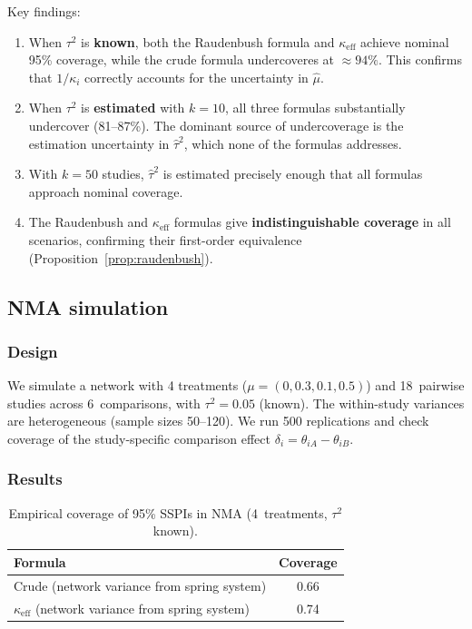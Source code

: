 \documentclass[12pt]{article}
\begin{document}
Key findings:
\begin{enumerate}
  \item When $\tau^2$ is \textbf{known}, both the Raudenbush formula and
    $\kappa_{\mathrm{eff}}$ achieve nominal 95\% coverage, while the
    crude formula undercoveres at $\approx 94\%$.  This confirms that
    $1/\kappa_i$ correctly accounts for the uncertainty in $\hat\mu$.

  \item When $\tau^2$ is \textbf{estimated} with $k=10$, all three
    formulas substantially undercover (81--87\%).  The dominant source of
    undercoverage is the estimation uncertainty in $\hat\tau^2$, which
    none of the formulas addresses.

  \item With $k=50$ studies, $\hat\tau^2$ is estimated precisely enough
    that all formulas approach nominal coverage.

  \item The Raudenbush and $\kappa_{\mathrm{eff}}$ formulas give
    \textbf{indistinguishable coverage} in all scenarios, confirming
    their first-order equivalence (Proposition~\ref{prop:raudenbush}).
\end{enumerate}

\subsection{NMA simulation}

\subsubsection{Design}

We simulate a network with 4 treatments ($\mu = (0, 0.3, 0.1, 0.5)$)
and 18~pairwise studies across 6~comparisons, with $\tau^2 = 0.05$
(known).  The within-study variances are heterogeneous (sample sizes
50--120).  We run 500 replications and check coverage of the
study-specific comparison effect $\delta_i = \theta_{iA} - \theta_{iB}$.

\subsubsection{Results}

\begin{table}[h]
\centering
\caption{Empirical coverage of 95\% SSPIs in NMA
(4~treatments, $\tau^2$ known).}
\label{tab:coverage_nma}
\begin{tabular}{lc}
\toprule
Formula & Coverage \\
\midrule
Crude (network variance from spring system)
  & 0.66 \\
$\kappa_{\mathrm{eff}}$ (network variance from spring system)
  & 0.74 \\
\bottomrule
\end{tabular}
\end{table}
\end{document}
